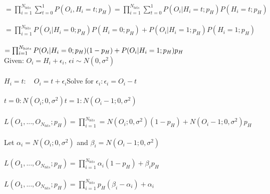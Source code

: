 \documentclass{article}
\begin{document}
\begin{enumerate}
\begin{enumerate}
		\vspace{0.001em}\\
		$=\prod_{i=1}^{N_{bits}}\sum_{t=0}^1P(O_i,H_i=t;p_H)=\prod_{i=1}^{N_{bits}}\sum_{t=0}^1P(O_i|H_i=t;p_H)P(H_i=t;p_H)$\\
		\vspace{0.001em}\\
		$=\prod_{i=1}^{N_{bits}}P(O_i|H_i=0;p_H)P(H_i=0;p_H)+P(O_i|H_i=1;p_H)P(H_i=1;p_H)$\\
		\vspace{0.001em}\\
		$=\prod_{i=1}^{N_{bits}}P(O_i|H_i=0;p_H)(1-p_H)+P(O_i|H_i=1;p_H)p_H\\$
		\vspace{0.01em}\\
		Given: $O_i=H_i+\epsilon_i\text{, }\epsilon{i}\sim{}N(0,\sigma^2)$\\
		\vspace{0.001em}\\
		$H_i=t:\hspace{1em}O_i=t+\epsilon_i$\hspace{2em}Solve for $\epsilon_i:$\hspace{2em}$\epsilon_i=O_i-t$\\
		\vspace{0.001em}\\
		$t=0:$\hspace{2em}$N(O_i;0,\sigma^2)$\hspace{2em}$t=1:$\hspace{2em}$N(O_i-1;0,\sigma^2)$\\
		\vspace{0.01em}\\
		$L(O_1,{...},O_{N_{bits}};p_H)=\prod_{i=1}^{N_{bits}}=N(O_i;0,\sigma^2)(1-p_H)+N(O_i-1;0,\sigma^2)p_H$\\
		\vspace{0.01em}\\
		Let $\alpha_i=N(O_i;0,\sigma^2)$ and $\beta_i=N(O_i-1;0,\sigma^2)$\\
		\vspace{0.01em}\\
		$L(O_1,{...},O_{N_{bits}};p_H)=\prod_{i=1}^{N_{bits}}\alpha_i(1-p_H)+\beta_ip_H$\\
		\vspace{0.001em}\\
		\Large$L(O_1,{...},O_{N_{bits}};p_H)=\prod_{i=1}^{N_{bits}}p_H(\beta_i-\alpha_i)+\alpha_i$\\
		\vspace{0.001em}\\

\end{enumerate}
\end{enumerate}
\end{document}
